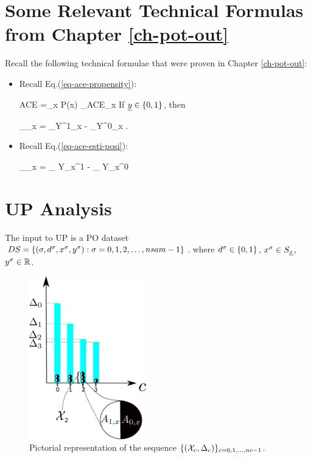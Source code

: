 \section{Some Relevant
 Technical Formulas from Chapter \ref{ch-pot-out}}
Recall
the following technical formulae
that were proven in 
Chapter \ref{ch-pot-out}:

\begin{itemize}

\item
Recall Eq.(\ref{eq-ace-propensity}):

\beq
ACE =\sum_x P(x)
_{ACE_x}
\eeq
If $\rvy\in \bool$, then

\beq
{}_{\displaystyle \delta_x}
=
_{\displaystyle Y^1_x}
-
_{\displaystyle Y^0_x}
\;.
\eeq

\item
Recall 
Eq.(\ref{eq-ace-esti-posi}):

\beq
{}_{\displaystyle\delta_x}
=
_
{\displaystyle Y_x^1}
-
_
{\displaystyle Y_x^0}
\label{eq-est-ace-uplift}
\eeq




\end{itemize}


\section{UP Analysis}
\label{sec-up-analysis}

The input
to UP is a PO
dataset $DS= \{ (\sigma, d^\sigma, x^\sigma, y^\sigma):
 \sigma=0, 1, 2, \ldots, nsam-1\}$.
where $d^\sigma\in \{0,1\}$, $x^\s \in S_\rvx$,
$y^\sigma\in { \mathbb{R}}$.

\begin{figure}[h!]
\centering
\includegraphics[width=2in]
{uplift/uplift-bins.png}
\caption{
Pictorial
representation
of the sequence
$\{({\cal X}_c, \Delta_c)\}_{c=0, 1, \ldots, nc-1}$.
}
\label{fig-uplift-bins}
\end{figure}


